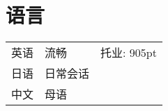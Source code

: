 \documentclass[]{deedy-resume-openfont}
\begin{document}
\begin{minipage}[t]{0.74\textwidth}

\section{语言} 

\begin{tabular}{rll}

英语   & 流畅 & 托业: 905pt \\
日语	     & 日常会话 &   \\
中文	     & 母语  &  \\
\end{tabular}


% 
% 

\end{minipage} 
\end{document}
